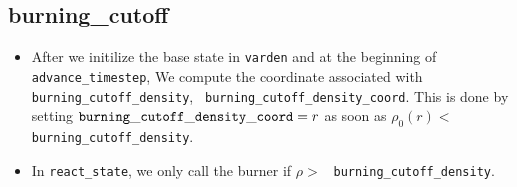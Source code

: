 \subsection{burning\_cutoff}

\begin{itemize}
\item After we initilize the base state in {\tt varden} and at the
  beginning of {\tt advance\_timestep}, We compute the coordinate
  associated with {\tt burning\_cutoff\_density}, {\tt
    burning\_cutoff\_density\_coord}.  This is done by setting ${\tt
    burning\_cutoff\_density\_coord}= r$ as soon as $\rho_0(r) <$ {\tt
    burning\_cutoff\_density}.

\item In {\tt react\_state}, we only call the burner if $\rho >$ {\tt
  burning\_cutoff\_density}.
\end{itemize}

